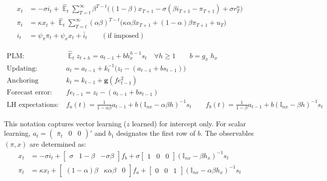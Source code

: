 \documentclass[11pt]{article}
\renewcommand{\[}{\begin{equation}}
\renewcommand{\]}{\end{equation}}
\DeclareMathOperator{\E}{\mathbb{E}}
\begin{document}
\vspace{-0.5cm}

\begin{align}
x_t &=  -\sigma i_t +\hat{\E}_t \sum_{T=t}^{\infty} \beta^{T-t }\big( (1-\beta)x_{T+1} - \sigma(\beta i_{T+1} - \pi_{T+1}) +\sigma r_T^n \big)  \label{prestons18}  \\
\pi_t &= \kappa x_t +\hat{\E}_t \sum_{T=t}^{\infty} (\alpha\beta)^{T-t }\big( \kappa \alpha \beta x_{T+1} + (1-\alpha)\beta \pi_{T+1} + u_T\big) \label{prestons19}  \\
i_t &= \psi_{\pi}\pi_t + \psi_{x} x_t  + \bar{i}_t \label{TR} \quad \quad (\text{if imposed})
\end{align}

\vspace{-1.2cm}

\begin{align}
\text{PLM:} \quad \quad & \hat{\E}_t z_{t+h}  =  a_{t-1} + bh_x^{h-1}s_t  \quad \forall h\geq 1 \quad \quad b = g_x\; h_x \quad \quad  \label{PLM} \\
\text{Updating:} \quad \quad & a_{t}  =a_{t-1} +k_t^{-1}\big(z_{t} -(a_{t-1}+b s_{t-1}) \big)  \\
\text{Anchoring function:} \quad \quad & k_t  = k_{t-1} + \mathbf{g}(fe_{t-1}^2) \\
\text{Forecast error:} \quad \quad & fe_{t-1}  = z_t - (a_{t-1}+b s_{t-1})\\
\text{LH expectations:} \quad \quad & f_a(t) = \frac{1}{1-\alpha\beta}a_{t-1}  + b(\mathbb{I}_{nx} - \alpha\beta h)^{-1}s_t \quad \quad  f_b(t) = \frac{1}{1-\beta}a_{t-1}  + b(\mathbb{I}_{nx} - \beta h)^{-1}s_t  \label{fafb_anal}
\end{align}

\vspace{-0.5cm}

This notation captures vector learning ($z$ learned) for intercept only. For scalar learning, $a_t= \begin{pmatrix} \bar{\pi}_t & 0 & 0\end{pmatrix}' $ and $b_1$ designates the first row of $b$. The observables $(\pi, x)$ are determined as:
\begin{align}
x_t &=  -\sigma i_t + \begin{bmatrix} \sigma & 1-\beta & -\sigma\beta \end{bmatrix} f_b + \sigma \begin{bmatrix} 1 & 0 & 0 \end{bmatrix} (\mathbb{I}_{nx} - \beta h_x)^{-1} s_t \label{A9} \\
\pi_t &= \kappa x_t  + \begin{bmatrix} (1-\alpha)\beta & \kappa\alpha\beta & 0 \end{bmatrix}  f_a + \begin{bmatrix} 0 & 0 & 1 \end{bmatrix}  (\mathbb{I}_{nx} - \alpha \beta h_x)^{-1}  s_t \label{A10}
\end{align}
\end{document}
